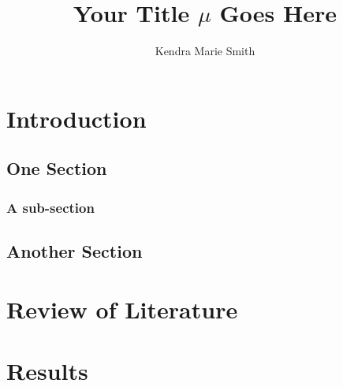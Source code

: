 \documentclass[doublespace,nopageskip]{UVAthesis}
\title{Your Title $\mu$ Goes Here}
\author{Kendra Marie Smith}
\begin{document}
  \frontmatter
  \maketitle
  \tableofcontents

% 
	\listoffigures
	\listoftables

 
 
 

	\mainmatter

	\chapter{Introduction} \label{ch:introduction}
   	\lipsum[1-10]		
      
    \section{One Section} \label{se:one_section}
		\lipsum[4-5]	
			\subsection{A sub-section} \label{ss:this_subsection}
			\lipsum[11-14]	
		\section{Another Section} \label{se:another_section}
		\lipsum[17-18]	

    \chapter{Review of Literature} \label{ch:lit_review}
    \lipsum[2-4]
	\chapter{Results} \label{ch:results}
	\lipsum[9-11]
\end{document}
